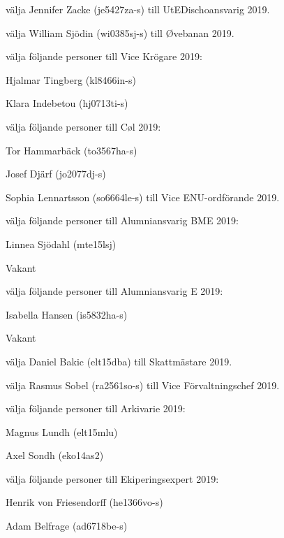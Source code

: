 \documentclass[10pt]{article}
\begin{document}
\begin{paragrafer}
\begin{paralist}
    \Mba välja Jennifer Zacke (je5427za-s) till UtEDischoansvarig 2019.

    \Mba välja William Sjödin (wi0385sj-s) till Øvebanan 2019.

    \Mba välja följande personer till Vice Krögare 2019:
    \begin{tightdashlist}
        \item Hjalmar Tingberg (kl8466in-s)
        \item Klara Indebetou (hj0713ti-s)
    \end{tightdashlist}

    \Mba välja följande personer till Cøl 2019:
    \begin{tightdashlist}
        \item Tor Hammarbäck (to3567ha-s)
        \item Josef Djärf (jo2077dj-s)
    \end{tightdashlist}

    \Mba Sophia Lennartsson (so6664le-s) till Vice ENU-ordförande 2019.

    \Mba välja följande personer till Alumniansvarig BME 2019:
    \begin{tightdashlist}
        \item Linnea Sjödahl (mte15lsj)
        \item Vakant
    \end{tightdashlist}

    \Mba välja följande personer till Alumniansvarig E 2019:
    \begin{tightdashlist}
        \item Isabella Hansen (is5832ha-s)
        \item Vakant
    \end{tightdashlist}

    \Mba välja Daniel Bakic (elt15dba) till Skattmästare 2019.

    \Mba välja Rasmus Sobel (ra2561so-s) till Vice Förvaltningschef 2019.

    \Mba välja följande personer till Arkivarie 2019:
    \begin{tightdashlist}
        \item Magnus Lundh (elt15mlu)
        \item Axel Sondh (eko14as2)
    \end{tightdashlist}

    \Mba välja följande personer till Ekiperingsexpert 2019:
    \begin{tightdashlist}
        \item Henrik von Friesendorff (he1366vo-s)
        \item Adam Belfrage (ad6718be-s)
    \end{tightdashlist}


\end{paralist}
\end{paragrafer}
\end{document}
